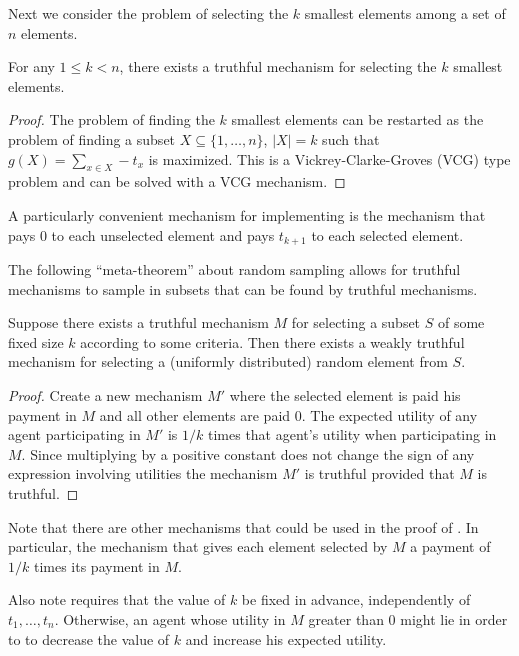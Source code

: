 \documentclass{article}
\begin{document}
Next we consider the problem of selecting the $k$ smallest elements
among a set of $n$ elements.

\begin{thm}
For any $1\le k< n$, there exists a truthful mechanism for selecting
the $k$ smallest elements.  
\end{thm}

\begin{proof} 
The problem of finding the $k$ smallest elements can be restarted as
the problem of finding a subset $X\subseteq\{1,\ldots,n\}$, $|X|=k$
such that $g(X) = \sum_{x\in X} -t_x$ is maximized.  This is a
Vickrey-Clarke-Groves (VCG) type problem and can be solved with a VCG
mechanism.
\end{proof}

A particularly convenient mechanism for implementing
 is the mechanism that pays 0 to each unselected
element and pays $t_{k+1}$ to each selected element.  

The following ``meta-theorem'' about random sampling allows for
truthful mechanisms to sample in subsets that can be found by truthful
mechanisms.

\begin{thm}
Suppose there exists a truthful mechanism $M$ for selecting a subset
$S$ of some fixed size $k$ according to some criteria.  Then there
exists a weakly truthful mechanism for selecting a (uniformly
distributed) random element from $S$.
\end{thm}

\begin{proof}
Create a new mechanism $M'$ where the selected element is paid his
payment in $M$ and all other elements are paid 0.  The expected
utility of any agent participating in $M'$ is $1/k$ times that agent's
utility when participating in $M$.  Since multiplying by a positive
constant does not change the sign of any expression involving
utilities the mechanism $M'$ is truthful provided that $M$ is
truthful.
\end{proof}

Note that there are other mechanisms that could be used in the proof
of .  In particular, the mechanism that gives
each element selected by $M$ a payment of $1/k$ times its payment in
$M$.

Also note  requires that the value of $k$ be fixed in
advance, independently of $t_1,\ldots,t_n$.  Otherwise, an agent whose
utility in $M$ greater than 0 might lie in order to to decrease the
value of $k$ and increase his expected utility.
\end{document}
